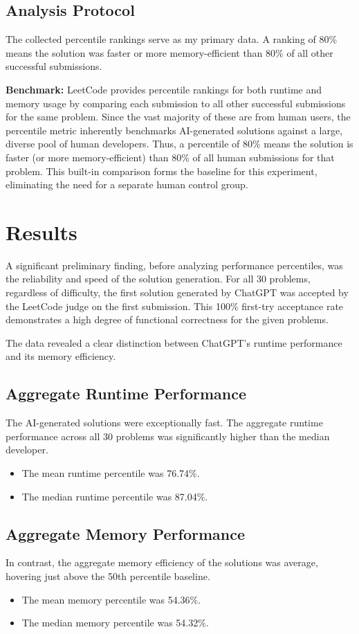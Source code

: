 \documentclass[12pt, a4paper]{article}
\begin{document}
\subsection{Analysis Protocol}
The collected percentile rankings serve as my primary data. A ranking of 80\% means the solution was faster or more memory-efficient than 80\% of all other successful submissions.

\textbf{Benchmark:} LeetCode provides percentile rankings for both runtime and memory usage by comparing each submission to all other successful submissions for the same problem. Since the vast majority of these are from human users, the percentile metric inherently benchmarks AI-generated solutions against a large, diverse pool of human developers. Thus, a percentile of 80\% means the solution is faster (or more memory-efficient) than 80\% of all human submissions for that problem. This built-in comparison forms the baseline for this experiment, eliminating the need for a separate human control group.

\section{Results}

A significant preliminary finding, before analyzing performance percentiles, was the reliability and speed of the solution generation. For all 30 problems, regardless of difficulty, the first solution generated by ChatGPT was accepted by the LeetCode judge on the first submission. This 100\% first-try acceptance rate demonstrates a high degree of functional correctness for the given problems.

The data revealed a clear distinction between ChatGPT's runtime performance and its memory efficiency.

\subsection{Aggregate Runtime Performance}
The AI-generated solutions were exceptionally fast. The aggregate runtime performance across all 30 problems was significantly higher than the median developer.
\begin{itemize}
    \item The mean runtime percentile was 76.74\%.
    \item The median runtime percentile was 87.04\%.
\end{itemize}

\subsection{Aggregate Memory Performance}
In contrast, the aggregate memory efficiency of the solutions was average, hovering just above the 50th percentile baseline.
\begin{itemize}
    \item The mean memory percentile was 54.36\%.
    \item The median memory percentile was 54.32\%.
\end{itemize}
\end{document}
